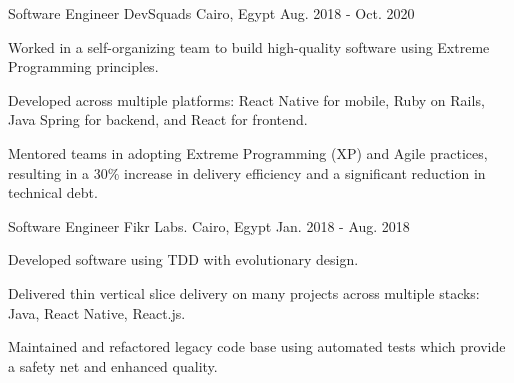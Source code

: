 \begin{cventries}
  \cventry
    {Software Engineer} %
    {DevSquads} %
    {Cairo, Egypt} %
    {Aug. 2018 - Oct. 2020} %
    {
      \begin{cvitems} %
        \item {Worked in a self-organizing team to build high-quality software using Extreme Programming principles.}
        \item {Developed across multiple platforms: React Native for mobile, Ruby on Rails, Java Spring for backend, and React for frontend.}
        \item {Mentored teams in adopting Extreme Programming (XP) and Agile practices, resulting in a 30\% increase in delivery efficiency and a significant reduction in technical debt.}
      \end{cvitems}
    }

  \cventry
    {Software Engineer} %
    {Fikr Labs.} %
    {Cairo, Egypt} %
    {Jan. 2018 - Aug. 2018} %
    {
      \begin{cvitems} %
        \item {Developed software using TDD with evolutionary design.}
        \item {Delivered thin vertical slice delivery on many projects across
multiple stacks: Java, React Native, React.js.}
        \item {Maintained and refactored legacy code base using automated tests which provide a safety net and enhanced quality.}
      \end{cvitems}
    }

\end{cventries}
